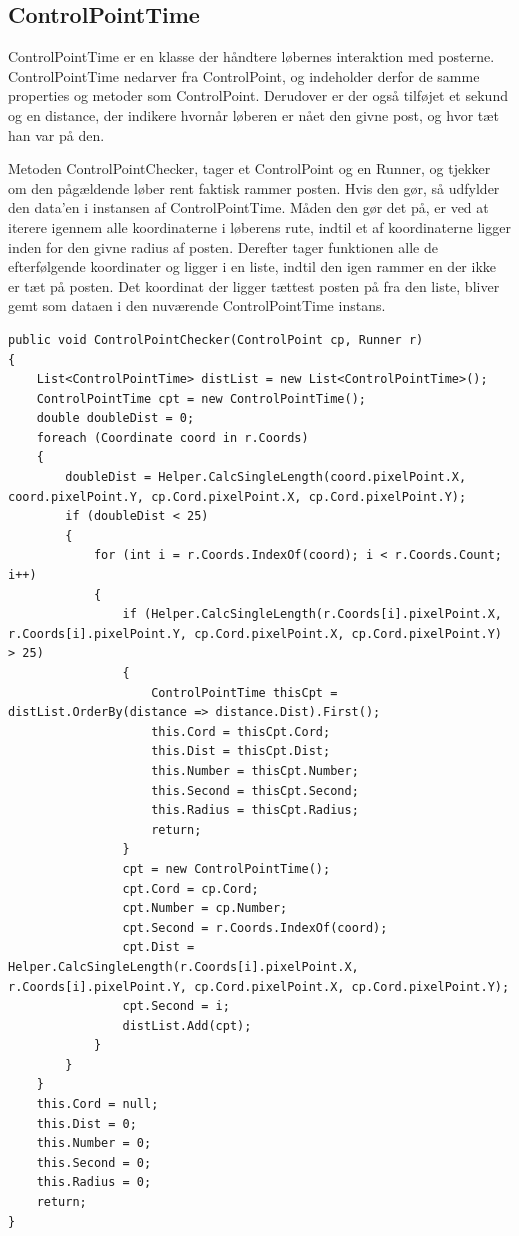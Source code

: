 \subsection{ControlPointTime}
ControlPointTime er en klasse der håndtere løbernes interaktion med posterne. ControlPointTime nedarver fra ControlPoint, og indeholder derfor de samme properties og metoder som ControlPoint. Derudover er der også tilføjet et sekund og en distance, der indikere hvornår løberen er nået den givne post, og hvor tæt han var på den. 

Metoden ControlPointChecker, tager et ControlPoint og en Runner, og tjekker om den pågældende løber rent faktisk rammer posten. Hvis den gør, så udfylder den data’en i instansen af ControlPointTime. 
Måden den gør det på, er ved at iterere igennem alle koordinaterne i løberens rute, indtil et af koordinaterne ligger inden for den givne radius af posten. Derefter tager funktionen alle de efterfølgende koordinater og ligger i en liste, indtil den igen rammer en der ikke er tæt på posten. 
Det koordinat der ligger tættest posten på fra den liste, bliver gemt som dataen i den nuværende ControlPointTime instans. 


\begin{lstlisting}
public void ControlPointChecker(ControlPoint cp, Runner r)
{
    List<ControlPointTime> distList = new List<ControlPointTime>();
    ControlPointTime cpt = new ControlPointTime();
    double doubleDist = 0;
    foreach (Coordinate coord in r.Coords)
    {
        doubleDist = Helper.CalcSingleLength(coord.pixelPoint.X, coord.pixelPoint.Y, cp.Cord.pixelPoint.X, cp.Cord.pixelPoint.Y);
        if (doubleDist < 25)
        {
            for (int i = r.Coords.IndexOf(coord); i < r.Coords.Count; i++)
            {
                if (Helper.CalcSingleLength(r.Coords[i].pixelPoint.X, r.Coords[i].pixelPoint.Y, cp.Cord.pixelPoint.X, cp.Cord.pixelPoint.Y) > 25)
                {
                    ControlPointTime thisCpt = distList.OrderBy(distance => distance.Dist).First();
                    this.Cord = thisCpt.Cord;
                    this.Dist = thisCpt.Dist;
                    this.Number = thisCpt.Number;
                    this.Second = thisCpt.Second;
                    this.Radius = thisCpt.Radius;
                    return;
                }
                cpt = new ControlPointTime();
                cpt.Cord = cp.Cord;
                cpt.Number = cp.Number;
                cpt.Second = r.Coords.IndexOf(coord);
                cpt.Dist = Helper.CalcSingleLength(r.Coords[i].pixelPoint.X, r.Coords[i].pixelPoint.Y, cp.Cord.pixelPoint.X, cp.Cord.pixelPoint.Y);
                cpt.Second = i;
                distList.Add(cpt);
            }    
        }
    }
    this.Cord = null;
    this.Dist = 0;
    this.Number = 0;
    this.Second = 0;
    this.Radius = 0;
    return;
}
\end{lstlisting}

